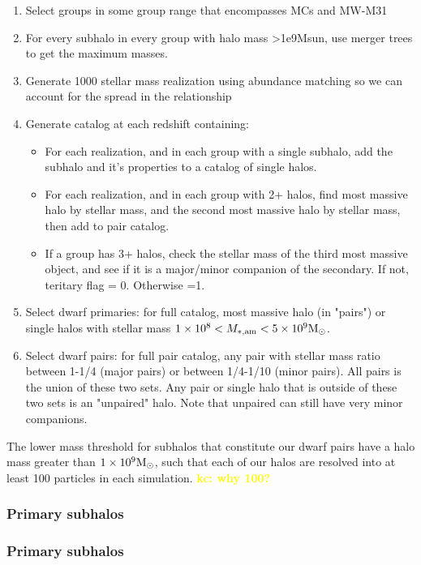 \documentclass[twocolumn]{aastex631}
\newcommand{\kc}[1]{\textcolor{yellow}{\textbf{kc: #1}} }
\begin{document}
\begin{enumerate}
  \item Select groups in some group range that encompasses MCs and MW-M31
  \item For every subhalo in every group with halo mass >1e9Msun, use merger trees to get the maximum masses.
  \item Generate 1000 stellar mass realization using abundance matching so we can account for the spread in the relationship
  \item Generate catalog at each redshift containing: 
  \begin{itemize}
    \item For each realization, and in each group with a single subhalo, add the subhalo and it's properties to a catalog of single halos.
    \item For each realization, and in each group with 2+ halos, find most massive halo by stellar mass, and the second most massive halo by stellar mass, then add to pair catalog. 
    \item If a group has 3+ halos, check the stellar mass of the third most massive object, and see if it is a major/minor companion of the secondary. If not, teritary flag = 0. Otherwise =1.
  \end{itemize}
  \item Select dwarf primaries: for full catalog, most massive halo (in "pairs") or single halos with stellar mass $1\times10^{8} < M_{*,\mathrm{am}} < 5\times10^{9} \mathrm{M}_\odot$. 
  \item Select dwarf pairs: for full pair catalog, any pair with stellar mass ratio between 1-1/4 (major pairs) or between 1/4-1/10 (minor pairs). All pairs is the union of these two sets. Any pair or single halo that is outside of these two sets is an "unpaired" halo. Note that unpaired can still have very minor companions. 
\end{enumerate}

The lower mass threshold for subhalos that constitute our dwarf pairs have a halo mass greater than $1\times10^9\mathrm{M}_\odot$, such that each of our halos are resolved into at least 100 particles in each simulation.  
\kc{why 100?} 

\subsubsection{Primary subhalos}\label{sec:methods-crit-prims}

\subsubsection{Primary subhalos}\label{sec:methods-crit-pairs}
\end{document}
